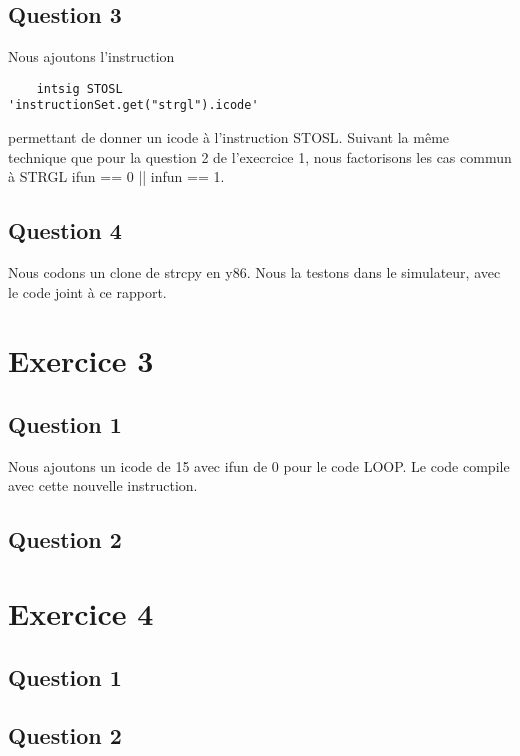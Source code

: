 \documentclass[a4paper,10pt]{article}
\begin{document}
\subsection{Question 3}
Nous ajoutons l'instruction
\begin{verbatim}
    intsig STOSL                     'instructionSet.get("strgl").icode'
\end{verbatim}
permettant de donner un icode à l'instruction STOSL. Suivant la même technique que pour la question 2 de l'execrcice 1, nous factorisons les cas commun à STRGL ifun == 0 || infun == 1.

\subsection{Question 4}
Nous codons un clone de strcpy en y86. Nous la testons dans le simulateur, avec le code joint à ce rapport.

\section{Exercice 3}
\subsection{Question 1}
Nous ajoutons un icode de 15 avec ifun de 0 pour le code LOOP. Le code compile avec cette nouvelle instruction.

\subsection{Question 2}


\section{Exercice 4}
\subsection{Question 1}

\subsection{Question 2}
\end{document}
